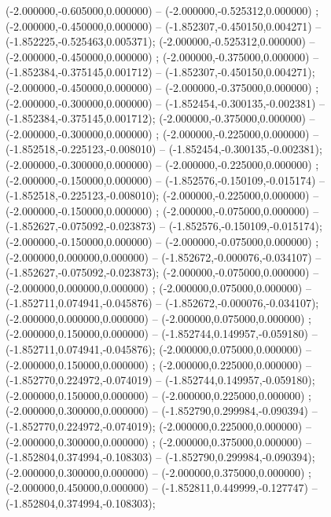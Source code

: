  (-2.000000,-0.605000,0.000000) -- (-2.000000,-0.525312,0.000000) ;
 (-2.000000,-0.450000,0.000000) -- (-1.852307,-0.450150,0.004271) -- (-1.852225,-0.525463,0.005371);
 (-2.000000,-0.525312,0.000000) -- (-2.000000,-0.450000,0.000000) ;
 (-2.000000,-0.375000,0.000000) -- (-1.852384,-0.375145,0.001712) -- (-1.852307,-0.450150,0.004271);
 (-2.000000,-0.450000,0.000000) -- (-2.000000,-0.375000,0.000000) ;
 (-2.000000,-0.300000,0.000000) -- (-1.852454,-0.300135,-0.002381) -- (-1.852384,-0.375145,0.001712);
 (-2.000000,-0.375000,0.000000) -- (-2.000000,-0.300000,0.000000) ;
 (-2.000000,-0.225000,0.000000) -- (-1.852518,-0.225123,-0.008010) -- (-1.852454,-0.300135,-0.002381);
 (-2.000000,-0.300000,0.000000) -- (-2.000000,-0.225000,0.000000) ;
 (-2.000000,-0.150000,0.000000) -- (-1.852576,-0.150109,-0.015174) -- (-1.852518,-0.225123,-0.008010);
 (-2.000000,-0.225000,0.000000) -- (-2.000000,-0.150000,0.000000) ;
 (-2.000000,-0.075000,0.000000) -- (-1.852627,-0.075092,-0.023873) -- (-1.852576,-0.150109,-0.015174);
 (-2.000000,-0.150000,0.000000) -- (-2.000000,-0.075000,0.000000) ;
 (-2.000000,0.000000,0.000000) -- (-1.852672,-0.000076,-0.034107) -- (-1.852627,-0.075092,-0.023873);
 (-2.000000,-0.075000,0.000000) -- (-2.000000,0.000000,0.000000) ;
 (-2.000000,0.075000,0.000000) -- (-1.852711,0.074941,-0.045876) -- (-1.852672,-0.000076,-0.034107);
 (-2.000000,0.000000,0.000000) -- (-2.000000,0.075000,0.000000) ;
 (-2.000000,0.150000,0.000000) -- (-1.852744,0.149957,-0.059180) -- (-1.852711,0.074941,-0.045876);
 (-2.000000,0.075000,0.000000) -- (-2.000000,0.150000,0.000000) ;
 (-2.000000,0.225000,0.000000) -- (-1.852770,0.224972,-0.074019) -- (-1.852744,0.149957,-0.059180);
 (-2.000000,0.150000,0.000000) -- (-2.000000,0.225000,0.000000) ;
 (-2.000000,0.300000,0.000000) -- (-1.852790,0.299984,-0.090394) -- (-1.852770,0.224972,-0.074019);
 (-2.000000,0.225000,0.000000) -- (-2.000000,0.300000,0.000000) ;
 (-2.000000,0.375000,0.000000) -- (-1.852804,0.374994,-0.108303) -- (-1.852790,0.299984,-0.090394);
 (-2.000000,0.300000,0.000000) -- (-2.000000,0.375000,0.000000) ;
 (-2.000000,0.450000,0.000000) -- (-1.852811,0.449999,-0.127747) -- (-1.852804,0.374994,-0.108303);
